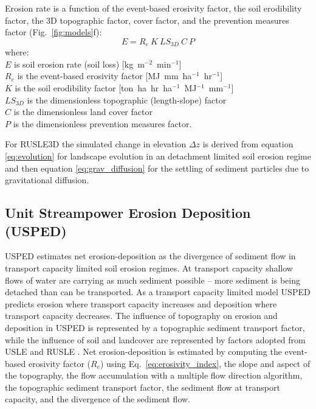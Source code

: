 \documentclass[gmd, manuscript]{copernicus}
\begin{document}
Erosion rate is a function of the event-based erosivity factor, 
the soil erodibility factor, the 3D topographic factor, cover factor, and the prevention measures factor 
(Fig.~\ref{fig:models}f):
%
\begin{equation}
\label{eq:rusle}
{E = R_e ~ K ~ LS_{3D} ~ C ~ P}
\end{equation}
%
{\small
\noindent
where: \\
\noindent
\hspace*{0.5em} $E$ is soil erosion rate (soil loss) [\unit{kg~m}$^{-2}$~\unit{min}$^{-1}$]\\
\hspace*{0.5em} $R_e$ is the event-based erosivity factor [\unit{MJ~mm~ha}$^{-1}$~\unit{hr}$^{-1}$]\\
\hspace*{0.5em} $K$ is the soil erodibility factor [\unit{ton~ha~hr~ha}$^{-1}$~\unit{MJ}$^{-1}$~\unit{mm}$^{-1}$]\\
\hspace*{0.5em} $LS_{3D}$ is the dimensionless topographic (length-slope) factor\\
\hspace*{0.5em} $C$ is the dimensionless land cover factor\\
\hspace*{0.5em} $P$ is the dimensionless prevention measures factor.\\
}

\noindent
For RUSLE3D the simulated change in elevation 
$\Delta z$
is derived from 
equation \ref{eq:evolution}
for landscape evolution in an detachment limited soil erosion regime
and then equation \ref{eq:grav_diffusion}
for the settling of sediment particles due to gravitational diffusion.


\subsection{Unit Streampower Erosion Deposition (USPED)} \label{usped_model}
USPED estimates net erosion-deposition as the divergence of sediment flow
in transport capacity limited soil erosion regimes.
At transport capacity 
shallow flows of water are carrying as much sediment possible 
-- more sediment is being detached 
than can be transported.
As a transport capacity limited model
USPED predicts erosion where transport capacity increases
and deposition where transport capacity decreases. 
The influence of topography on erosion and deposition in USPED 
is represented by a topographic sediment transport factor,
while the influence of soil and landcover are represented by 
factors adopted from USLE and RUSLE
\citep{Mitasova1996}.
%
Net erosion-deposition is estimated by computing
the event-based erosivity factor ($R_e$) 
using Eq.~\ref{eq:erosivity_index},
the slope and aspect of the topography,
the flow accumulation with a multiple flow direction algorithm,
the topographic sediment transport factor,
the sediment flow at transport capacity,
and the divergence of the sediment flow. 
\end{document}
